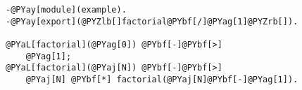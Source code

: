\begin{Verbatim}[commandchars=@\[\]]
-@PYay[module](example).
-@PYay[export](@PYZlb[]factorial@PYbf[/]@PYag[1]@PYZrb[]).

@PYaL[factorial](@PYag[0]) @PYbf[-]@PYbf[>]
    @PYag[1];
@PYaL[factorial](@PYaj[N]) @PYbf[-]@PYbf[>]
    @PYaj[N] @PYbf[*] factorial(@PYaj[N]@PYbf[-]@PYag[1]).
\end{Verbatim}
